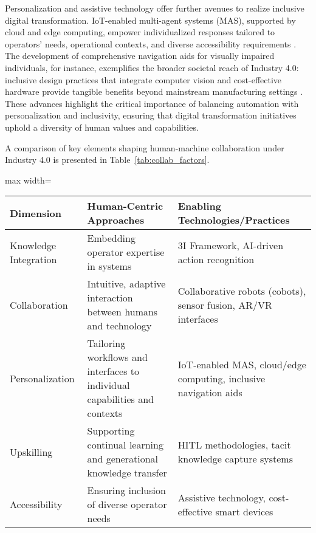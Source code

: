 Personalization and assistive technology offer further avenues to realize inclusive digital transformation. IoT-enabled multi-agent systems (MAS), supported by cloud and edge computing, empower individualized responses tailored to operators' needs, operational contexts, and diverse accessibility requirements \cite{ref54}. The development of comprehensive navigation aids for visually impaired individuals, for instance, exemplifies the broader societal reach of Industry 4.0: inclusive design practices that integrate computer vision and cost-effective hardware provide tangible benefits beyond mainstream manufacturing settings \cite{ref65}. These advances highlight the critical importance of balancing automation with personalization and inclusivity, ensuring that digital transformation initiatives uphold a diversity of human values and capabilities.

A comparison of key elements shaping human-machine collaboration under Industry 4.0 is presented in Table~\ref{tab:collab_factors}.

\begin{table*}[htbp]
\centering
\caption{Key Factors for Effective Human-Machine Collaboration in Industry 4.0}
\label{tab:collab_factors}
\begin{adjustbox}{max width=\textwidth}
\begin{tabular}{lll}
\toprule
\textbf{Dimension} & \textbf{Human-Centric Approaches} & \textbf{Enabling Technologies/Practices} \\
\midrule
Knowledge Integration & Embedding operator expertise in systems & 3I Framework, AI-driven action recognition \\
Collaboration & Intuitive, adaptive interaction between humans and technology & Collaborative robots (cobots), sensor fusion, AR/VR interfaces \\
Personalization & Tailoring workflows and interfaces to individual capabilities and contexts & IoT-enabled MAS, cloud/edge computing, inclusive navigation aids \\
Upskilling & Supporting continual learning and generational knowledge transfer & HITL methodologies, tacit knowledge capture systems \\
Accessibility & Ensuring inclusion of diverse operator needs & Assistive technology, cost-effective smart devices \\
\bottomrule
\end{tabular}
\end{adjustbox}
\end{table*}

